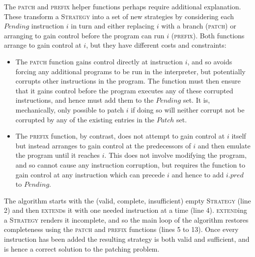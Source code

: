 The \textsc{patch} and \textsc{prefix} helper functions perhaps
require additional explanation.  These transform a \textsc{Strategy}
into a set of new strategies by considering each $\mathit{Pending}$
instruction $i$ in turn and either replacing $i$ with a branch
(\textsc{patch}) or arranging to gain control before the program can
run $i$ (\textsc{prefix}).  Both functions arrange to gain control at
$i$, but they have different costs and constraints:
\begin{itemize}
\item The \textsc{patch} function gains control directly at
  instruction $i$, and so avoids forcing any additional programs to be
  run in the interpreter, but potentially corrupts other instructions
  in the program.  The function must then ensure that it gains control
  before the program executes any of these corrupted instructions, and
  hence must add them to the $\mathit{Pending}$ set.  It is,
  mechanically, only possible to patch $i$ if doing so will neither
  corrupt not be corrupted by any of the existing entries in the
  $\mathit{Patch}$ set.
\item The \textsc{prefix} function, by contrast, does not attempt to
  gain control at $i$ itself but instead arranges to gain control at
  the predecessors of $i$ and then emulate the program until it
  reaches $i$.  This does not involve modifying the program, and so
  cannot cause any instruction corruption, but requires the function
  to gain control at any instruction which can precede $i$ and hence
  to add $i.\mathit{pred}$ to $\mathit{Pending}$.
\end{itemize}
The algorithm starts with the (valid, complete, insufficient) empty
\textsc{Strategy} (line 2) and then \textsc{extend}s it with one
needed instruction at a time (line 4).  \textsc{extend}ing a
\textsc{Strategy} renders it incomplete, and so the main loop of the
algorithm restores completeness using the \textsc{patch} and
\textsc{prefix} functions (lines 5 to 13).  Once every instruction has
been added the resulting strategy is both valid and sufficient, and is
hence a correct solution to the patching problem.
